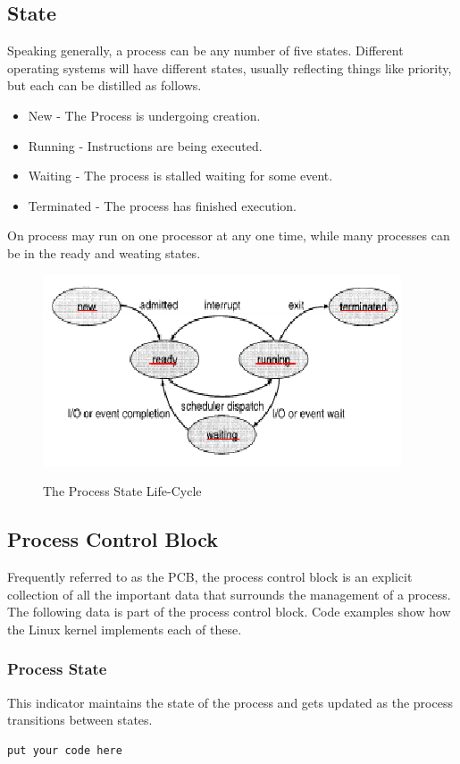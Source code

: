 \documentclass[10pt,a4paper]{article}
\begin{document}
\subsection{State}
Speaking generally, a process can be any number of five states. Different operating systems will have different states, usually reflecting things like priority, but each can be distilled as follows. 
\begin{itemize}
\item New - The Process is undergoing creation.
\item Running - Instructions are being executed.
\item Waiting - The process is stalled waiting for some event.
\item Terminated - The process has finished execution.
\end{itemize}
On process may run on one processor at any one time, while many processes can be in the ready and weating states. 
\begin{figure}
\caption{The Process State Life-Cycle \cite{OSCONCEPTS}}
\begin{center}
\includegraphics[scale=0.45]{../images/process-state.png}
\label{procstate}
\end{center}
\end{figure}
\subsection{Process Control Block}
Frequently referred to as the PCB, the process control block is an explicit collection of all the important data that surrounds the management of a process. The following data is part of the process control block. Code examples show how the Linux kernel implements each of these. 
\subsubsection{Process State} 
This indicator maintains the state of the process and gets updated as the process transitions between states. 
\begin{lstlisting}
put your code here
\end{lstlisting}
\end{document}
